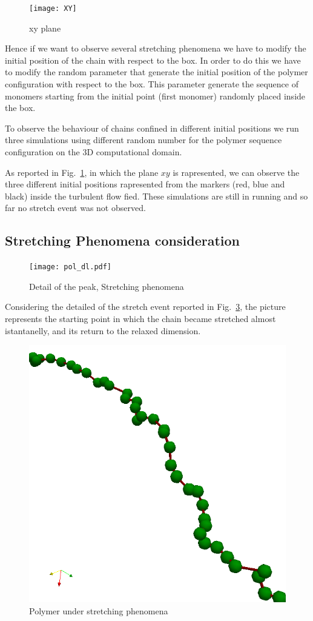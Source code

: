 \begin{figure}[h!]
\centering
\texttt{[image: XY]}
\caption{xy plane}
\label{xy}
\end{figure}
Hence if we want to observe several stretching phenomena we have to modify the initial position of the chain 
with respect to the box. 
In order to do this we have to modify the random parameter that generate the initial position of the polymer configuration with respect to the box. This parameter generate the sequence of monomers starting from the initial point (first monomer) randomly placed inside the box.

To observe the behaviour of chains confined in different initial positions we run three simulations using different random number for the polymer sequence configuration on the 3D computational domain. 

As reported in Fig.~\ref{xy}, in which the plane $xy$ is rapresented, we can observe the three different initial positions rapresented from the markers (red, blue and black) inside the turbulent flow fied. 
These simulations are still in running and so far no stretch event was not observed.

\subsection{Stretching Phenomena consideration}
\begin{figure}[h!]
\centering
\texttt{[image: pol\_dl.pdf]}
\caption{Detail of the peak, Stretching phenomena}
\label{detail}
\end{figure}

Considering the detailed of the stretch event reported in Fig.~\ref{detail}, the picture represents the starting 
point in which the chain became stretched almost istantanelly, and its return to the relaxed dimension.



\begin{figure}[h!]
\centering
\includegraphics[width=.52\textwidth]{poly-stretch}
\caption{Polymer under stretching phenomena}
\label{detail}
\end{figure}

